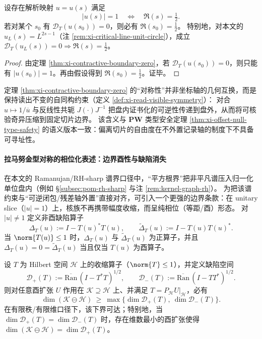 \begin{corollary}\label{cor:xi-contractive-critical-slice-rigidity}
设存在解析映射 \(u=u(s)\) 满足
\[
|u(s)|=1\quad\Longleftrightarrow\quad \Re(s)=\tfrac12.
\]
若对某个 \(s_0\) 有 \(\mathcal{D}_T(u(s_0))=0\)，则必有 \(\Re(s_0)=\tfrac12\)。
特别地，对本文的 \(u_L(s)=L^{2s-1}\)（注 \ref{rem:xi-critical-line-unit-circle}），成立 \(\mathcal{D}_T(u_L(s))=0\Rightarrow \Re(s)=\tfrac12\)。
\end{corollary}

\begin{proof}
由定理 \ref{thm:xi-contractive-boundary-zero}，若 \(\mathcal{D}_T(u(s_0))=0\)，则只能有 \(|u(s_0)|=1\)。再由假设得到 \(\Re(s_0)=\tfrac12\)。证毕。
\end{proof}

\begin{remark}\label{rem:xi-symmetry-object-autread}
定理 \ref{thm:xi-contractive-boundary-zero} 的“对称性”并非坐标轴的几何互换，而是保持读出不变的自同构约束（定义 \ref{def:xi-read-visible-symmetry}）：
对合 \(u\mapsto 1/\overline u\) 与反线性共轭 \(J(\cdot)J^{-1}\) 把盘内证书化的可逆性传递到盘外，从而将可核验奇异压缩到固定切片边界。
该含义与 \(\mathbf{PW}\) 类型安全定理 \ref{thm:xi-offset-null-type-safety} 的语义版本一致：偏离切片的自由度在不外置记录轴的制度下不具备可寻址性。
\end{remark}

\paragraph{拉马努金型对称的相位化表述：边界酉性与缺陷消失}
在本文的 Ramanujan/RH-sharp 谱界口径中，“平方根界”把非平凡谱压入归一化单位盘内（例如 \S\ref{subsec:pom-rh-sharp} 与注 \ref{rem:kernel-graph-rh}）。
为把该谱约束与“可逆闭包/残差轴外置”直接对齐，可引入一个更强的边界条款：在 unitary slice（\(|u|=1\)）上，核族不再携带幅度收缩，而呈纯相位（等距/酉）形态。
对 \(|u|\neq 1\) 定义非酉缺陷算子
\[
\Delta_T(u):=I-T(u)^{*}T(u),\qquad
\widetilde{\Delta}_T(u):=I-T(u)T(u)^{*}.
\]
当 \(\norm{T(u)}\le 1\) 时，\(\Delta_T(u)\) 与 \(\widetilde{\Delta}_T(u)\) 为正算子，并且 \(\Delta_T(u)=0=\widetilde{\Delta}_T(u)\) 当且仅当 \(T(u)\) 为酉算子。
\par

\begin{theorem}[缺陷指标与最小酉扩张自由度]\label{thm:xi-defect-residual-degree}
设 \(T\) 为 Hilbert 空间 \(\mathcal{H}\) 上的收缩算子（\(\norm{T}\le 1\)），并定义缺陷空间
\[
\mathcal{D}_{+}(T):=\overline{\mathrm{Ran}}\,(I-T^{*}T)^{1/2},
\qquad
\mathcal{D}_{-}(T):=\overline{\mathrm{Ran}}\,(I-TT^{*})^{1/2}.
\]
则对任意酉扩张 \(U\) 作用在 \(\mathcal{K}\supseteq \mathcal{H}\) 上、并满足
\(
T=P_{\mathcal{H}}U|_{\mathcal{H}}
\)，必有
\[
\dim(\mathcal{K}\ominus\mathcal{H})\ \ge\ \max\{\dim\mathcal{D}_{+}(T),\ \dim\mathcal{D}_{-}(T)\}.
\]
在有限秩/有限维口径下，该下界可达；特别地，当 \(\dim\mathcal{D}_{+}(T)=\dim\mathcal{D}_{-}(T)\) 时，存在维数最小的酉扩张使得
\(
\dim(\mathcal{K}\ominus\mathcal{H})=\dim\mathcal{D}_{+}(T)
\)。
\end{theorem}

